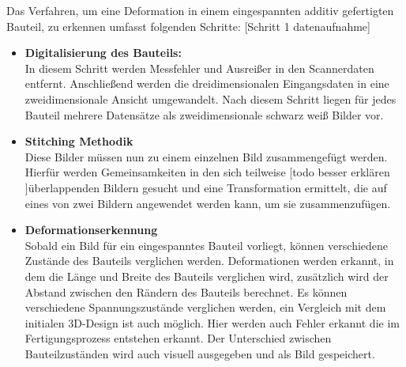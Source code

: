 Das Verfahren, um eine Deformation in einem eingespannten additiv gefertigten
Bauteil, zu erkennen umfasst folgenden Schritte:
[Schritt 1 datenaufnahme]
\begin{itemize}
    \item \textbf{Digitalisierung des Bauteils:}\\
        In diesem Schritt werden Messfehler und Ausreißer
        in den Scannerdaten entfernt. Anschließend werden die dreidimensionalen 
        Eingangsdaten in eine zweidimensionale Ansicht umgewandelt.
        Nach diesem Schritt liegen für jedes Bauteil mehrere Datensätze als 
        zweidimensionale schwarz weiß Bilder vor.
    \item \textbf{Stitching Methodik}\\
        Diese Bilder müssen nun zu einem einzelnen Bild zusammengefügt werden.
        Hierfür werden Gemeinsamkeiten in den sich 
        teilweise [todo besser erklären ]überlappenden Bildern gesucht und eine Transformation ermittelt,
        die auf eines von zwei Bildern angewendet werden kann, um sie zusammenzufügen.
    \item \textbf{Deformationserkennung}\\
        Sobald ein Bild für ein eingespanntes Bauteil vorliegt, können verschiedene 
        Zustände des Bauteils verglichen werden. Deformationen werden erkannt, in dem 
        die Länge und Breite des Bauteils verglichen wird, zusätzlich wird der 
        Abstand zwischen den Rändern des Bauteils berechnet. Es können verschiedene
        Spannungszustände verglichen werden, ein Vergleich mit dem initialen 
        3D-Design ist auch möglich. Hier werden auch Fehler erkannt die im 
        Fertigungsprozess entstehen erkannt. Der Unterschied zwischen Bauteilzuständen
        wird auch visuell ausgegeben und als Bild gespeichert.
        
\end{itemize}
























